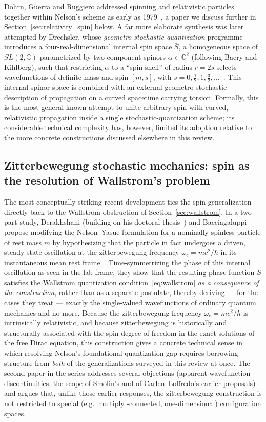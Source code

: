 \documentclass[11pt]{article}
\begin{document}
Dohrn, Guerra and Ruggiero addressed spinning and relativistic particles together within Nelson's scheme as early as
1979~\cite{dohrnguerraruggiero79}, a paper we discuss further in
Section~\ref{sec:relativity_spin} below. A far more elaborate synthesis was
later attempted by Drechsler, whose \emph{geometro-stochastic quantization}
programme introduces a four-real-dimensional internal spin space $\bar S$,
a homogeneous space of $SL(2,\mathbb C)$ parametrized by two-component
spinors $\alpha\in\mathbb C^2$ (following Bacry and Kihlberg), such that
restricting $\alpha$ to a ``spin shell'' of radius $r=2s$ selects
wavefunctions of definite mass and spin $[m,s]$, with $s=0,\tfrac12,1
,\tfrac32,\dots$~\cite{drechsler96}. This internal spinor space is combined
with an external geometro-stochastic description of propagation on a curved
spacetime carrying torsion. Formally, this is the most general known
attempt to unite arbitrary spin with curved, relativistic propagation
inside a single stochastic-quantization scheme; its considerable technical
complexity has, however, limited its adoption relative to the more concrete
constructions discussed elsewhere in this review.

\subsection{Zitterbewegung stochastic mechanics: spin as the resolution of Wallstrom's problem}

The most conceptually striking recent development ties the spin
generalization directly back to the Wallstrom obstruction of
Section~\ref{sec:wallstrom}. In a two-part study, Derakhshani (building on
his doctoral thesis~\cite{derakhshanithesis}) and Bacciagaluppi propose
modifying the Nelson--Yasue formulation for a nominally spinless particle
of rest mass $m$ by hypothesizing that the particle in fact undergoes a
driven, steady-state oscillation at the zitterbewegung frequency $\omega_c
= mc^2/\hbar$ in its instantaneous mean rest 
frame~\cite{derakhshani15,derakhshani16}. Time-symmetrizing the phase of
this internal oscillation as seen in the lab frame, they show that the
resulting phase function $S$ satisfies the Wallstrom quantization
condition~\eqref{eq:wallstrom} \emph{as a consequence of the construction},
rather than as a separate postulate, thereby deriving --- for the cases
they treat --- exactly the single-valued wavefunctions of ordinary quantum
mechanics and no more. Because the zitterbewegung frequency 
$\omega_c=mc^2/\hbar$ is intrinsically relativistic, and because
zitterbewegung is historically and structurally associated with the spin
degree of freedom in the exact solutions of the free Dirac equation, this
construction gives a concrete technical sense in which resolving Nelson's
foundational quantization gap requires borrowing structure from \emph{both}
of the generalizations surveyed in this review at once. The second paper in
the series addresses several objections (apparent wavefunction
discontinuities, the scope of Smolin's and of Carlen--Loffredo's earlier
proposals) and argues that, unlike those earlier responses, the
zitterbewegung construction is not restricted to special (e.g.\ multiply
-connected, one-dimensional) configuration spaces.
\end{document}
